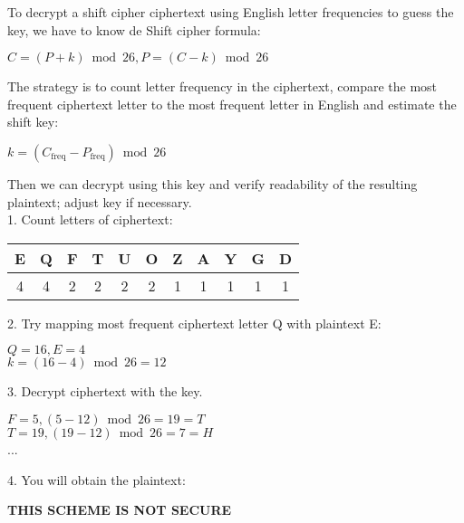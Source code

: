 \documentclass[]{article}
\numberwithin{figure}{section}
\begin{document}
\medskip

\noindent
To decrypt a shift cipher ciphertext using English letter frequencies to guess the key, we have to know de Shift cipher formula:\\
\begin{center}
	$C = (P + k) \bmod 26, P = (C - k) \bmod 26$
\end{center}
The strategy is to count letter frequency in the ciphertext, compare the most frequent ciphertext letter to the most frequent letter in English and estimate the shift key:\\
\begin{center}
	$k = (C_{\text{freq}} - P_{\text{freq}}) \bmod 26$
\end{center}
Then we can decrypt using this key and verify readability of the resulting plaintext; adjust key if necessary. \\

1. Count letters of ciphertext:
\begin{center}
	\begin{tabular}{|c|c|c|c|c|c|c|c|c|c|c|}
		\hline
		E & Q & F & T & U & O & Z & A & Y & G & D \\
		\hline
		4 & 4 & 2 & 2 & 2 & 2 & 1 & 1 & 1 & 1 & 1 \\
		\hline
	\end{tabular}
\end{center}


2. Try mapping most frequent ciphertext letter Q with plaintext E:
\begin{center}
	$Q = 16, E = 4$ \\
	$k = (16 - 4) \bmod 26 = 12$
\end{center}

3. Decrypt ciphertext with the key.
\begin{center}
	$F = 5, (5 - 12) \bmod 26 = 19 = T$ \\
	$T = 19, (19 - 12) \bmod 26 = 7 = H$ \\
	...
\end{center}

4. You will obtain the plaintext: 
\begin{center}
	\textbf{THIS SCHEME IS NOT SECURE}
\end{center}
\newpage
\end{document}
